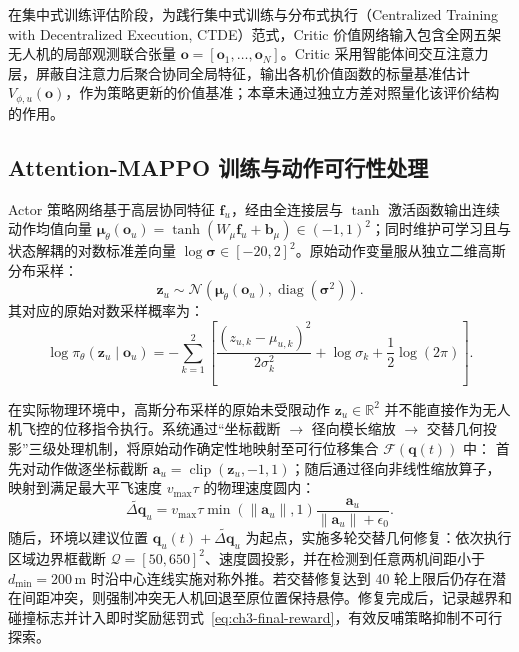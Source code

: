 在集中式训练评估阶段，为践行集中式训练与分布式执行（Centralized Training with Decentralized Execution, CTDE）范式，Critic 价值网络输入包含全网五架无人机的局部观测联合张量 $\mathbf o = [\mathbf o_1, \dots, \mathbf o_N]$。Critic 采用智能体间交互注意力层，屏蔽自注意力后聚合协同全局特征，输出各机价值函数的标量基准估计 $V_{\phi,u}(\mathbf o)$，作为策略更新的价值基准；本章未通过独立方差对照量化该评价结构的作用。

\subsection{Attention-MAPPO 训练与动作可行性处理}
\label{sec:ppo-training}
\label{sec:ch3-motion-repair}

Actor 策略网络基于高层协同特征 $\mathbf f_u$，经由全连接层与 $\tanh$ 激活函数输出连续动作均值向量 $\boldsymbol\mu_\theta(\mathbf o_u) = \tanh(W_\mu \mathbf f_u + \mathbf b_\mu) \in (-1, 1)^2$；同时维护可学习且与状态解耦的对数标准差向量 $\log\boldsymbol\sigma \in [-20, 2]^2$。原始动作变量服从独立二维高斯分布采样：
\begin{equation}
    \mathbf z_u \sim \mathcal N\left(\boldsymbol\mu_\theta(\mathbf o_u), \operatorname{diag}(\boldsymbol\sigma^2)\right).
    \label{eq:ch3-normal-policy}
\end{equation}
其对应的原始对数采样概率为：
\begin{equation}
    \log\pi_\theta(\mathbf z_u \mid \mathbf o_u) = -\sum_{k=1}^2 \left[\frac{(z_{u,k} - \mu_{u,k})^2}{2\sigma_k^2} + \log\sigma_k + \frac{1}{2}\log(2\pi)\right].
    \label{eq:log-prob}
\end{equation}

在实际物理环境中，高斯分布采样的原始未受限动作 $\mathbf z_u \in \mathbb R^2$ 并不能直接作为无人机飞控的位移指令执行。系统通过“坐标截断 $\to$ 径向模长缩放 $\to$ 交替几何投影”三级处理机制，将原始动作确定性地映射至可行位移集合 $\mathcal F(\mathbf q(t))$ 中：
首先对动作做逐坐标截断 $\mathbf a_u = \operatorname{clip}(\mathbf z_u, -1, 1)$；随后通过径向非线性缩放算子，映射到满足最大平飞速度 $v_{\max}\tau$ 的物理速度圆内：
\begin{equation}
    \widetilde{\Delta\mathbf q}_u = v_{\max}\tau \min(\|\mathbf a_u\|, 1) \frac{\mathbf a_u}{\|\mathbf a_u\| + \epsilon_0}.
    \label{eq:ch3-radial-action}
\end{equation}
随后，环境以建议位置 $\mathbf q_u(t) + \widetilde{\Delta\mathbf q}_u$ 为起点，实施多轮交替几何修复：依次执行区域边界框截断 $\mathcal Q=[50, 650]^2$、速度圆投影，并在检测到任意两机间距小于 $d_{\min}=200\,\mathrm{m}$ 时沿中心连线实施对称外推。若交替修复达到 40 轮上限后仍存在潜在间距冲突，则强制冲突无人机回退至原位置保持悬停。修复完成后，记录越界和碰撞标志并计入即时奖励惩罚式~\eqref{eq:ch3-final-reward}，有效反哺策略抑制不可行探索。

